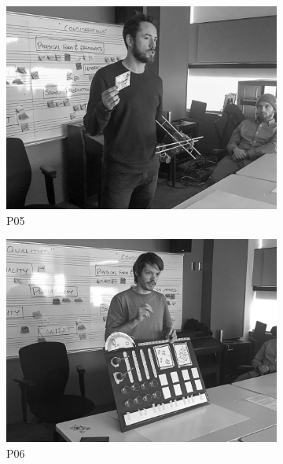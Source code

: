 \documentclass[letterpaper, 12pt]{article}
\begin{document}
\begin{figure}[t]
    \centering
    \begin{subfigure}{0.49\textwidth}
        \centering
        \includegraphics[width=1\textwidth]{P05.jpg}
        \caption{P05}
        \label{fig:presentations_P05}
    \end{subfigure}
    \begin{subfigure}{0.49\textwidth}
        \centering
        \includegraphics[width=1\textwidth]{P06.jpg}
        \caption{P06}
        \label{fig:presentations_P06}
    \end{subfigure}
    \begin{subfigure}{0.49\textwidth}
        \centering

\end{subfigure}
\end{figure}
\end{document}
